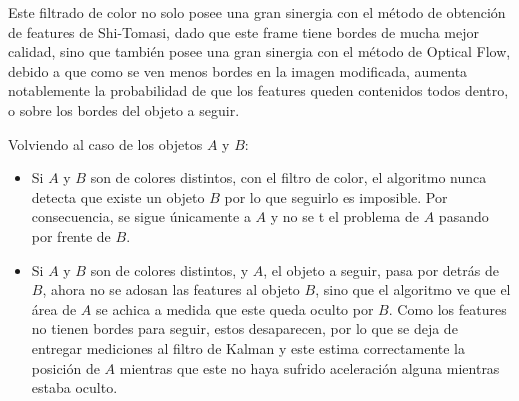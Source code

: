 Este filtrado de color no solo posee una gran sinergia con el método de obtención de features de Shi-Tomasi, dado que este frame tiene bordes de mucha mejor calidad, sino que también posee una gran sinergia con el método de Optical Flow, debido a que como se ven menos bordes en la imagen modificada, aumenta notablemente la probabilidad de que los features queden contenidos todos dentro, o sobre los bordes del objeto a seguir.

Volviendo al caso de los objetos $A$ y $B$:

\begin{itemize}
\item Si $A$ y $B$ son de colores distintos, con el filtro de color, el algoritmo nunca detecta que existe un objeto $B$ por lo que seguirlo es imposible. Por consecuencia, se sigue únicamente a $A$ y no se t el problema de $A$ pasando por frente de $B$.
\item Si $A$ y $B$ son de colores distintos, y $A$, el objeto a seguir, pasa por detrás de $B$, ahora no se adosan las features al objeto $B$, sino que el algoritmo ve que el área de $A$ se achica a medida que este queda oculto por $B$. Como los features no tienen bordes para seguir, estos desaparecen, por lo que se deja de entregar mediciones al filtro de Kalman y este estima correctamente la posición de $A$ mientras que este no haya sufrido aceleración alguna mientras estaba oculto. 
\end{itemize}

